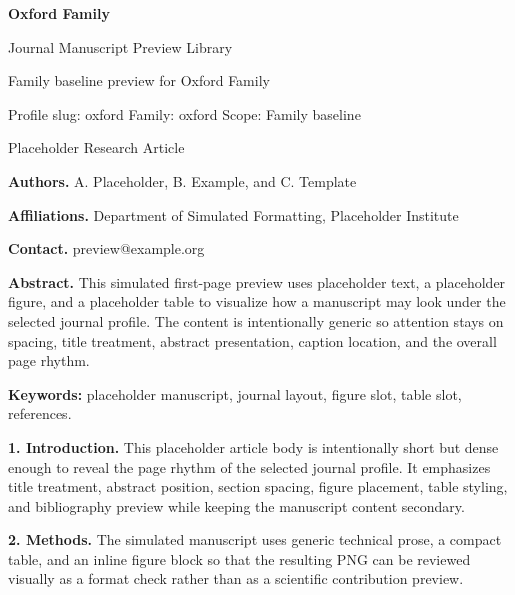 \documentclass[10pt,a4paper]{article}
\begin{document}
\begin{center}
{\LARGE\bfseries Oxford Family}\par
\vspace{0.25em}
{\small Journal Manuscript Preview Library}\par
\vspace{0.15em}
{\footnotesize Family baseline preview for Oxford Family}\par
\vspace{0.2em}
{\footnotesize Profile slug: oxford \quad Family: oxford \quad Scope: Family baseline}
\end{center}
\vspace{0.2em}
 Placeholder Research Article\par\vspace{0.4em}


\noindent\textbf{Authors.} A. Placeholder, B. Example, and C. Template\par
\noindent\textbf{Affiliations.} Department of Simulated Formatting, Placeholder Institute\par
\noindent\textbf{Contact.} preview@example.org\par
\vspace{0.4em}
\noindent\textbf{Abstract.} This simulated first-page preview uses placeholder text, a placeholder figure, and a placeholder table to visualize how a manuscript may look under the selected journal profile. The content is intentionally generic so attention stays on spacing, title treatment, abstract presentation, caption location, and the overall page rhythm.\par\vspace{0.6em}
\noindent\textbf{Keywords:} placeholder manuscript, journal layout, figure slot, table slot, references.\par\vspace{0.6em}


\small
\textbf{1. Introduction.} This placeholder article body is intentionally short but dense enough to reveal the page rhythm of the selected journal profile. It emphasizes title treatment, abstract position, section spacing, figure placement, table styling, and bibliography preview while keeping the manuscript content secondary.

\textbf{2. Methods.} The simulated manuscript uses generic technical prose, a compact table, and an inline figure block so that the resulting PNG can be reviewed visually as a format check rather than as a scientific contribution preview.
\end{document}
